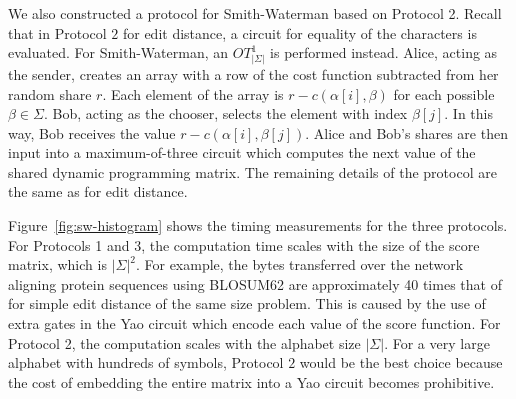 We also constructed a protocol for Smith-Waterman based on Protocol
2. Recall that in Protocol $2$ for edit distance, a circuit for
equality of the characters is evaluated. For Smith-Waterman, an
$OT_{|\Sigma|}^{1}$ is performed instead. Alice, acting as the sender,
creates an array with a row of the cost function subtracted from her
random share $r$.  Each element of the array is $r-c(\alpha[i],\beta)$
for each possible $\beta\in\Sigma$. Bob, acting as the chooser, selects
the element with index $\beta[j]$. In this way, Bob receives the value
$r-c(\alpha[i],\beta[j])$.  Alice and Bob's shares are then input into
a maximum-of-three circuit which computes the next value of the shared dynamic
programming matrix.  The remaining details of the protocol are the same
as for edit distance.


Figure~\ref{fig:sw-histogram} shows the timing measurements for the
three protocols.  For Protocols 1 and 3, the computation time scales
with the size of the score matrix, which is $|\Sigma|^{2}$. For
example, the bytes transferred over the network aligning protein
sequences using BLOSUM62 are approximately 40 times that of for simple
edit distance of the same size problem.  This is caused by the use of
extra gates in the Yao circuit which encode each value of the score
function.  For Protocol 2, the computation scales with the alphabet
size $|\Sigma|$. For a very large alphabet with hundreds of symbols,
Protocol $2$ would be the best choice because the cost of embedding
the entire matrix into a Yao circuit becomes prohibitive.

\begin{figure*}

\caption{Timing measurements (in minutes and seconds) comparing Smith-Waterman
Protocols 1, 2, and 3. For problem sizes (25,25) and (60,60), Protocol
1 could not evaluate the circuit.}

\label{fig:sw-histogram} 
\end{figure*}


